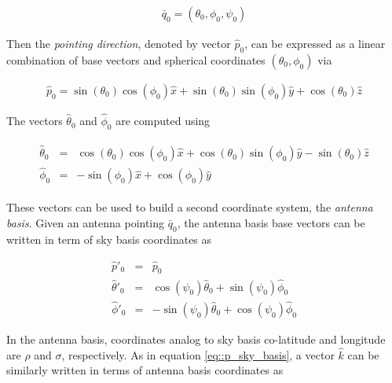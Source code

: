 \documentclass[a4paper,11pt]{article}
\begin{document}
\begin{equation}
\begin{aligned}
\bar{q}_0= (\theta_0,\phi_0,\psi_0)
\end{aligned}
\end{equation}

Then the \textsl{pointing direction}, denoted by vector $\hat{p}_0$, can be expressed as a linear combination of base vectors and spherical coordinates $(\theta_0,\phi_0)$ via

\begin{equation}
\begin{aligned}
\hat{p}_0 = \sin(\theta_0)\cos(\phi_0) \hat{x} + \sin(\theta_0)\sin(\phi_0) \hat{y} + \cos(\theta_0) \hat{z}
\end{aligned}
\label{eq::p_sky_basis}
\end{equation}

The vectors $\hat{\theta}_0$ and $\hat{\phi}_0$ are computed using

\begin{eqnarray}
\begin{aligned}
\hat{\theta}_0 &=&  \cos(\theta_0) \cos(\phi_0) \hat{x} + \cos(\theta_0)\sin(\phi_0) \hat{y} - \sin(\theta_0) \hat{z} \\
\hat{\phi}_0   &=&              -\sin(\phi_0) \hat{x} +             \cos(\phi_0) \hat{y}
\end{aligned}
\label{eq::tangent_sky_basis}
\end{eqnarray}

These vectors can be used to build a second coordinate system, the \textsl{antenna basis}. Given an antenna pointing $\bar{q}_0$, the antenna basis base vectors can be written in term of sky basis coordinates as 

\begin{eqnarray}
\hat{p}'_0      &=&  \hat{p}_0 \\
\hat{\theta}'_0 &=&  \cos(\psi_0)\hat{\theta}_0 + \sin(\psi_0)\hat{\phi}_0 \\
\hat{\phi}'_0   &=& -\sin(\psi_0)\hat{\theta}_0 + \cos(\psi_0)\hat{\phi}_0
\label{eq::antenna_base_vectors}
\end{eqnarray}

In the antenna basis, coordinates analog to sky basis co-latitude and longitude are $\rho$ and $\sigma$, respectively. As in equation \ref{eq::p_sky_basis}, a vector $\hat{k}$ can be similarly written in terms of antenna basis coordinates as
\end{document}
